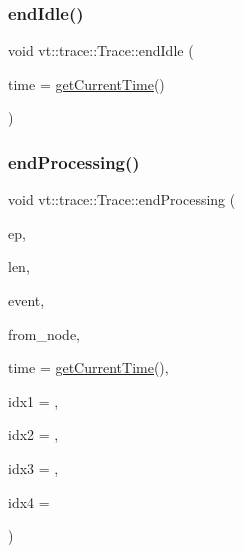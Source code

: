 \subsubsection{\texorpdfstring{end\+Idle()}{endIdle()}}
{\footnotesize\ttfamily void vt\+::trace\+::\+Trace\+::end\+Idle (\begin{DoxyParamCaption}\item[{double const}]{time = {\ttfamily \hyperlink{structvt_1_1trace_1_1_trace_a04cf6b76b4ced1bc90d246a34c948db5}{get\+Current\+Time}()} }\end{DoxyParamCaption})}

\mbox{\label{structvt_1_1trace_1_1_trace_ad086d14a272d11f16b8eaead65bc685f}} 
\subsubsection{\texorpdfstring{end\+Processing()}{endProcessing()}}
{\footnotesize\ttfamily void vt\+::trace\+::\+Trace\+::end\+Processing (\begin{DoxyParamCaption}\item[{\hyperlink{namespacevt_1_1trace_a3c14050715ba9eceaeff51fb3de64f2f}{Trace\+Entry\+I\+D\+Type} const}]{ep,  }\item[{\hyperlink{namespacevt_1_1trace_aeb598f45d67d41db7902e494f2f0ce59}{Trace\+Msg\+Len\+Type} const}]{len,  }\item[{\hyperlink{namespacevt_1_1trace_a64a7185f3e102df8d8258f263ccd1582}{Trace\+Event\+I\+D\+Type} const}]{event,  }\item[{\hyperlink{namespacevt_a866da9d0efc19c0a1ce79e9e492f47e2}{Node\+Type} const}]{from\+\_\+node,  }\item[{double const}]{time = {\ttfamily \hyperlink{structvt_1_1trace_1_1_trace_a04cf6b76b4ced1bc90d246a34c948db5}{get\+Current\+Time}()},  }\item[{uint64\+\_\+t const}]{idx1 = {},  }\item[{uint64\+\_\+t const}]{idx2 = {},  }\item[{uint64\+\_\+t const}]{idx3 = {},  }\item[{uint64\+\_\+t const}]{idx4 = {} }\end{DoxyParamCaption})}

\mbox{\label{structvt_1_1trace_1_1_trace_a2e07094a48c47b9c591003f0b57305c7}} 
